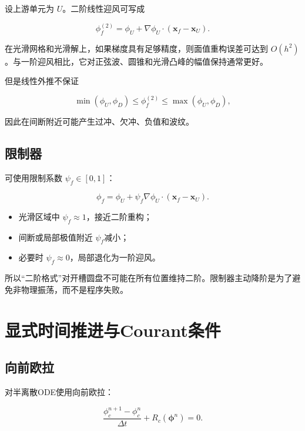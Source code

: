 \documentclass[UTF8,12pt,a4paper,fontset=fandol]{ctexart}
\numberwithin{equation}{section}
\newcommand{\xf}{\bm x}
\begin{document}
设上游单元为 $U$。二阶线性迎风可写成

\begin{equation}
  \phi_f^{(2)}
  =
  \phi_U
  +
  \nabla\phi_U\cdot(\xf_f-\xf_U).
  \label{eq:linear_upwind}
\end{equation}

在光滑网格和光滑解上，如果梯度具有足够精度，则面值重构误差可达到 $O(h^2)$。与一阶迎风相比，它对正弦波、圆锥和光滑凸峰的幅值保持通常更好。

但是线性外推不保证

\begin{equation}
  \min(\phi_U,\phi_D)
  \leq
  \phi_f^{(2)}
  \leq
  \max(\phi_U,\phi_D),
\end{equation}

因此在间断附近可能产生过冲、欠冲、负值和波纹。

\subsection{限制器}

可使用限制系数 $\psi_f\in[0,1]$：

\begin{equation}
  \phi_f
  =
  \phi_U
  +
  \psi_f
  \nabla\phi_U\cdot(\xf_f-\xf_U).
\end{equation}

\begin{itemize}
  \item 光滑区域中 $\psi_f\approx1$，接近二阶重构；
  \item 间断或局部极值附近 $\psi_f$减小；
  \item 必要时 $\psi_f\approx0$，局部退化为一阶迎风。
\end{itemize}

所以“二阶格式”对开槽圆盘不可能在所有位置维持二阶。限制器主动降阶是为了避免非物理振荡，而不是程序失败。

\section{显式时间推进与Courant条件}

\subsection{向前欧拉}

对半离散ODE使用向前欧拉：

\begin{equation}
  \frac{\phi_c^{n+1}-\phi_c^n}{\Delta t}
  +R_c(\bm\phi^n)=0.
\end{equation}
\end{document}
